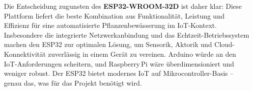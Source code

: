 \noindent Die Entscheidung zugunsten des \textbf{ESP32-WROOM-32D} ist daher klar: Diese Plattform liefert die beste Kombination aus Funktionalität, Leistung und Effizienz für eine automatisierte Pflanzenbewässerung im IoT-Kontext. Insbesondere die integrierte Netzwerkanbindung und das Echtzeit-Betriebssystem machen den ESP32 zur optimalen Lösung, um Sensorik, Aktorik und Cloud-Konnektivität zuverlässig in einem Gerät zu vereinen. Arduino würde an den IoT-Anforderungen scheitern, und Raspberry\,Pi wäre überdimensioniert und weniger robust. Der ESP32 bietet modernes IoT auf Mikrocontroller-Basis – genau das, was für das Projekt benötigt wird.
